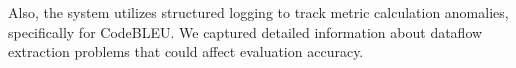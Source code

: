 Also, the system utilizes structured logging to track metric calculation anomalies, specifically for CodeBLEU. We captured detailed information about dataflow extraction problems that could affect evaluation accuracy. 

